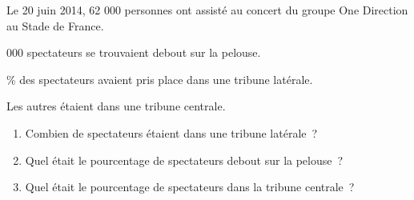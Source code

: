 \documentclass[exercice]{thedocument}%
\begin{document}
%
    Le 20 juin 2014, 62 000 personnes ont assisté au concert du groupe One
    Direction au Stade de France.\par{} 000 spectateurs se trouvaient debout sur la pelouse.\par{} \% des spectateurs avaient pris place dans une tribune latérale.\par\noindent
    Les autres étaient dans une tribune centrale.
    \begin{enumerate}
        \item Combien de spectateurs étaient dans une tribune latérale~?
        \item Quel était le pourcentage de spectateurs debout sur la pelouse~?
        \item Quel était le pourcentage de spectateurs dans la tribune centrale~?
    \end{enumerate}
\end{document}
